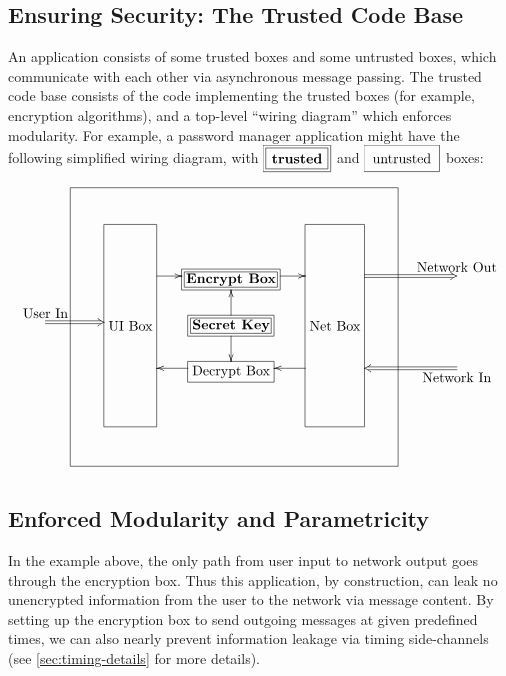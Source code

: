 \documentclass{article}
\newcommand{\trusted}[1]{*++[o][F=]{#1}}
\newcommand{\untrusted}[1]{*++[o][F-]{#1}}
\begin{document}
\subsection{Ensuring Security: The Trusted Code Base}
{%
\def\untrusted#1{\save[].[#1]*[F]\frm{}\restore}
\def\trusted#1{\save[].[#1]*[F=]\frm{}\restore}
An application consists of some trusted boxes and some untrusted boxes, which communicate with each other via asynchronous message passing.  The trusted code base consists of the code implementing the trusted boxes (for example, encryption algorithms), and a top-level ``wiring diagram'' which enforces modularity.  For example, a password manager application might have the following simplified wiring diagram, with $\xymatrix{*++[F=]{\txt{\textbf{trusted}}}}$ and $\xymatrix{*++[F-]{\txt{untrusted}}}$ boxes:

\noindent
\[
\xymatrix@-0.5pc{
&\untrusted{ddddddrrrr} \\
&&\untrusted{dddd}\txt{\phantom{UI Box}}& \txt{\phantom{Encrypt Box}} & \untrusted{dddd}\txt{\phantom{Net Box}}&& \\
&&\txt{\phantom{UI Box}}\ar[r]& \trusted{}\txt{\textbf{Encrypt Box}}\ar[r]     &                 \txt{\phantom{Net Box}}\ar@{=>}[rrr]^>{\txt{Network Out}}&&& \\
\ar@{=>}[rr]^<{\txt{User In}}&&\txt{UI Box}&  \ar[u]\ar[d]\trusted{}\txt{\textbf{Secret Key}}     &                 \txt{Net Box}& \\
&&\txt{\phantom{UI Box}}&  \ar[l]\untrusted{}\txt{Decrypt Box}     & \ar[l] \txt{\phantom{Net Box}}&&&\ar@{=>}[lll]^<{\txt{Network In}} \\
&&\txt{\phantom{UI Box}}& \txt{\phantom{Encrypt Box}} & \txt{\phantom{Net Box}}&& \\
&&\txt{\phantom{UI Box}}& \txt{\phantom{Encrypt Box}} & \txt{\phantom{Net Box}}&& \\
}
\]
}

\subsection{Enforced Modularity and Parametricity}
In the example above, the only path from user input to network output goes through the encryption box.  Thus this application, by construction, can leak no unencrypted information from the user to the network via message content.  By setting up the encryption box to send outgoing messages at given predefined times, we can also nearly prevent information leakage via timing side-channels (see \autoref{sec:timing-details} for more details).
\end{document}
